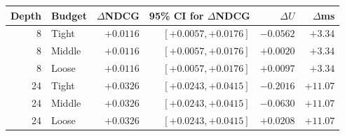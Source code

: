 \begin{tabular}{rlrrrr}
\toprule
Depth & Budget & $\Delta$NDCG & 95\% CI for $\Delta$NDCG & $\Delta U$ & $\Delta$ms \\
\midrule
8 & Tight & $+0.0116$ & $[+0.0057, +0.0176]$ & $-0.0562$ & $+3.34$ \\
8 & Middle & $+0.0116$ & $[+0.0057, +0.0176]$ & $+0.0020$ & $+3.34$ \\
8 & Loose & $+0.0116$ & $[+0.0057, +0.0176]$ & $+0.0097$ & $+3.34$ \\
24 & Tight & $+0.0326$ & $[+0.0243, +0.0415]$ & $-0.2016$ & $+11.07$ \\
24 & Middle & $+0.0326$ & $[+0.0243, +0.0415]$ & $-0.0630$ & $+11.07$ \\
24 & Loose & $+0.0326$ & $[+0.0243, +0.0415]$ & $+0.0208$ & $+11.07$ \\
\bottomrule
\end{tabular}
